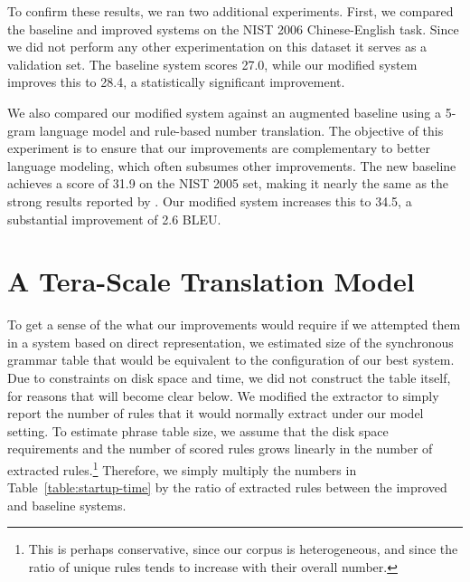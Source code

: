 To confirm these results, we ran two additional experiments.
First, we compared the baseline and improved systems on the NIST 2006 
Chinese-English task.  Since we did not perform any other experimentation
on this dataset it serves as a validation set.  The baseline system
scores 27.0, while our modified system improves this to 28.4,
a statistically significant improvement.

We also compared our modified system against an augmented baseline
using a 5-gram language model and rule-based number translation.  The objective
of this experiment is to ensure that our improvements are complementary to
better language modeling, which often subsumes other improvements.
The new baseline achieves a score of 31.9 on the NIST 2005 set, making
it nearly the same as the strong results reported by 
\citet{Chiang:2007:cl}.  Our modified system increases this to 
34.5, a substantial improvement of 2.6 BLEU.

\section{A Tera-Scale Translation Model}\label{sec:tera-scale-model}

To get a sense of the what our improvements would require
if we attempted them in a system based on direct representation,
we estimated size of the synchronous grammar table
that would be equivalent to the configuration of our best
system.  Due to constraints on disk space and time, we did not
construct the table itself, for reasons that will become
clear below.  We modified
the extractor to simply report the number of rules that it would
normally extract under our model setting.  To estimate 
phrase table size, we assume
that the disk space requirements and the number of scored rules
grows linearly in the number of extracted rules.\footnote{This
is perhaps conservative, since our corpus is heterogeneous, and
since the ratio of unique rules tends to increase with their
overall number.}
Therefore, we simply multiply the numbers in 
Table~\ref{table:startup-time} by the ratio of extracted
rules between the improved and baseline systems.

